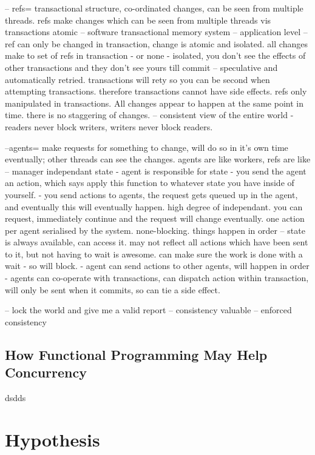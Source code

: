 \documentclass[12pt,a4paper]{article}
\begin{document}
-- refs= transactional structure, co-ordinated changes, can be seen from multiple threads. refs make changes which can be seen from multiple threads vis transactions atomic
-- software transactional memory system -- application level -- ref can only be changed in transaction, change is atomic and isolated. all changes make to set of refs in transaction - or none - isolated, you don't see the effects of other transactions and they don't see yours till commit -- speculative and automatically retried. transactions will rety so you can be second when attempting transactions. therefore transactions cannot have side effects. refs only manipulated in transactions. All changes appear to happen at the same point in time. there is no staggering of changes. -- consistent view of the entire world - readers never block writers, writers never block readers.


--agents= make requests for something to change, will do so in it's own time eventually; other threads can see the changes. agents are like workers, refs are like
-- manager independant state - agent is responsible for state - you send the agent an action, which says apply this function to whatever state you have inside of yourself.
- you send actions to agents, the request gets queued up in the agent, and eventually this will eventually happen. high degree of independant. you can request, immediately continue and the request will change eventually. one action per agent serialised by the system. none-blocking. things happen in order -- state is always available, can access it. may not reflect all actions which have been sent to it, but not having to wait is awesome. can make sure the work is done with a wait - so will block. - agent can send actions to other agents, will happen in order - agents can co-operate with transactions, can dispatch action within transaction, will only be sent when it commits, so can tie a side effect.

-- lock the world and give me a valid report -- consistency valuable  -- enforced consistency


\subsection{How Functional Programming May Help Concurrency}

\cite{promisesOfFunctionalProgramming}
\cite{theFreeLunchIsOver}
\cite{concurrencyChallenges}
dsdds

\newpage
\section{Hypothesis}
\end{document}
